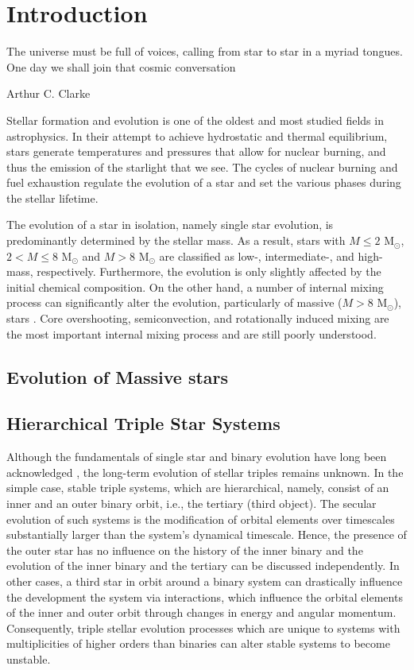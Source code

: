 \chapter{Introduction}

\epigraph{The universe must be full of voices, calling from star to star in a myriad tongues. One day we shall join that cosmic conversation}{Arthur C. Clarke}

Stellar formation and evolution is one of the oldest and most studied fields in astrophysics. In their attempt to achieve hydrostatic and thermal equilibrium, stars generate temperatures and pressures that allow for nuclear burning, and thus the emission of the starlight that we see. The cycles of nuclear burning and fuel exhaustion regulate the evolution of a star and set the various phases during the stellar lifetime.

The evolution of a star in isolation, namely single star evolution, is predominantly determined by the stellar mass. As a result, stars with $M \leq 2$ M$_{\odot}$, $2 < M \leq 8$ M$_{\odot}$ and $M > 8$ M$_{\odot}$ are classified as low-, intermediate-, and high-mass, respectively. Furthermore, the evolution is only slightly affected by the initial chemical composition.  On the other hand, a number of internal mixing process can significantly alter the evolution, particularly of massive ($M>8$ M$_{\odot}$), stars \citep{langer2012presupernova}. Core overshooting, semiconvection, and rotationally induced mixing are the most important internal mixing process \citep{schootemeijer2019constraining} and are still poorly understood. 


\section{Evolution of Massive stars}

\section{Hierarchical Triple Star Systems}



Although the fundamentals of single star and binary evolution have long been acknowledged \citep{postnov2014evolution,toonen2014popcorn}, the long-term evolution of stellar triples remains unknown. In the simple case, stable triple systems, which are hierarchical, namely, consist of an inner and an outer binary orbit, i.e., the tertiary (third object). The secular evolution of such systems is the modification of orbital elements over timescales substantially larger than the system's dynamical timescale. Hence, the presence of the outer star has no influence on the history of the inner binary and the evolution of the inner binary and the tertiary can be discussed independently. In other cases, a third star in orbit around a binary system can drastically influence the development the system via interactions, which influence the orbital elements of the inner and outer orbit through changes in energy and angular momentum. Consequently, triple stellar evolution processes which are unique to systems with multiplicities of higher orders than binaries can alter stable systems to become unstable.
